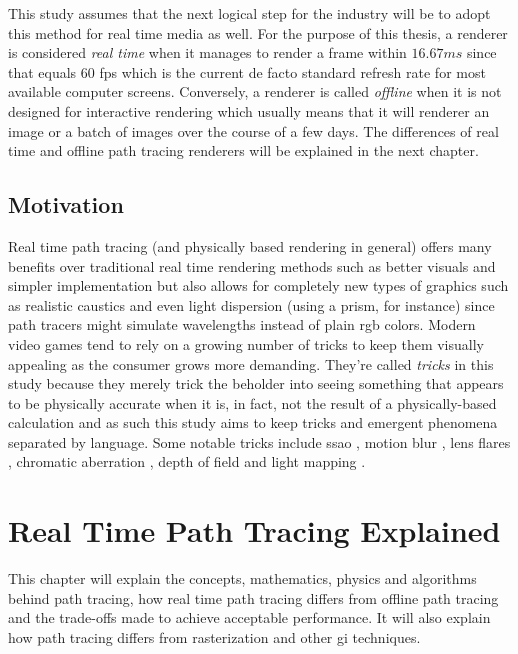 \documentclass[
  twoside,
  11pt, a4paper,
  footinclude=true,
  headinclude=true,
  cleardoublepage=empty
]{scrreprt}
\begin{document}
This study assumes that the next logical step for the industry will be to adopt this method for
real time media as well. For the purpose of this thesis, a renderer is considered
\textit{real time} when it manages to render a frame within \(16.67ms\) since that equals 60
\ac{fps} which is
the current de facto standard refresh rate for most available computer screens. Conversely, a
renderer is called \textit{offline} when it is not designed for interactive rendering which usually
means that it will renderer an image or a batch of images over the course of a few days. The
differences of real time and offline path tracing renderers will be explained in the next chapter.

\section{Motivation}
Real time path tracing (and physically based rendering in general) offers many
benefits over traditional real time rendering methods such as better visuals
and simpler implementation but also allows for completely new types of graphics
such as realistic caustics \cite{wiki:caustics} and even light dispersion
\cite{wiki:dispersion} (using a prism, for instance) since path tracers might simulate wavelengths
instead of plain \ac{rgb} colors. Modern video games tend
to rely on a growing number of tricks to keep them visually appealing as the
consumer grows more demanding. They're called \textit{tricks} in this study
because they merely trick the beholder into seeing something that appears to be
physically accurate when it is, in fact, not the result of a physically-based
calculation and as such this study aims to keep tricks and emergent phenomena
separated by language. Some notable tricks include \ac{ssao}
\cite{wiki:ssao}, motion blur \cite{wiki:motion-blur}, lens flares
\cite{wiki:lens-flare}, chromatic aberration \cite{wiki:chromatic-aberration},
depth of field \cite{wiki:depth-of-field} and light mapping \cite{wiki:lightmap}.

\chapter{Real Time Path Tracing Explained}
This chapter will explain the concepts, mathematics, physics and algorithms behind path tracing,
how real time path tracing differs from offline path tracing and the trade-offs made to achieve
acceptable performance. It will also explain how path tracing differs from rasterization and other
\ac{gi} techniques.
\end{document}
